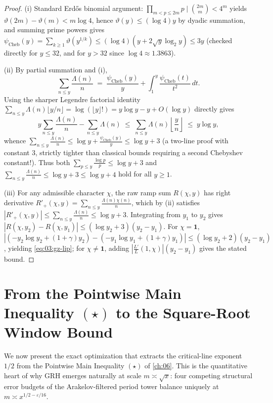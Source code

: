 \begin{proof}
(i) Standard Erd\H{o}s binomial argument: $\prod_{m < p \le 2m} p \mid \binom{2m}{m} < 4^m$ yields $\vartheta(2m) - \vartheta(m) < m\log 4$, hence $\vartheta(y) \le (\log 4) y$ by dyadic summation, and summing prime powers gives $\psi_{\mathrm{Cheb}}(y) = \sum_{k \ge 1} \vartheta(y^{1/k}) \le (\log 4)(y + 2\sqrt{y}\log_2 y) \le 3y$ (checked directly for $y \le 32$, and for $y > 32$ since $\log 4 \approx 1.3863$).

(ii) By partial summation and (i),
\[
  \sum_{n \le y} \frac{\Lambda(n)}{n} \;=\; \frac{\psi_{\mathrm{Cheb}}(y)}{y} + \int_1^y \frac{\psi_{\mathrm{Cheb}}(t)}{t^2}\,dt.
\]
Using the sharper Legendre factorial identity $\sum_{n \le y} \Lambda(n)\lfloor y/n \rfloor = \log(\lfloor y \rfloor!) = y\log y - y + O(\log y)$ directly gives
\[
  y \sum_{n \le y} \frac{\Lambda(n)}{n} - \sum_{n \le y} \Lambda(n) \;\le\; \sum_{n \le y} \Lambda(n)\left\lfloor \frac{y}{n} \right\rfloor \;\le\; y\log y,
\]
whence $\sum_{n \le y} \frac{\Lambda(n)}{n} \le \log y + \frac{\psi_{\mathrm{Cheb}}(y)}{y} \le \log y + 3$ (a two-line proof with constant $3$, strictly tighter than classical bounds requiring a second Chebyshev constant!). Thus both $\sum_{p \le y} \frac{\log p}{p} \le \log y + 3$ and $\sum_{n \le y}\frac{\Lambda(n)}{n} \le \log y + 3 \le \log y + 4$ hold for all $y \ge 1$.

(iii) For any admissible character $\chi$, the raw ramp sum $R(\chi, y)$ has right derivative $R'_+(\chi, y) = \sum_{n \le y} \frac{\Lambda(n)\chi(n)}{n}$, which by (ii) satisfies $|R'_+(\chi, y)| \le \sum_{n \le y} \frac{\Lambda(n)}{n} \le \log y + 3$. Integrating from $y_1$ to $y_2$ gives $|R(\chi, y_2) - R(\chi, y_1)| \le (\log y_2 + 3)(y_2 - y_1)$. For $\chi = \mathbf{1}$, $|(-y_2\log y_2 + (1+\gamma)y_2) - (-y_1\log y_1 + (1+\gamma)y_1)| \le (\log y_2 + 2)(y_2 - y_1)$, yielding \eqref{eq:03:gz-lip}; for $\chi \neq \mathbf{1}$, adding $|\frac{L'}{L}(1,\chi)|(y_2 - y_1)$ gives the stated bound.
\end{proof}

\section{From the Pointwise Main Inequality $(\star)$ to the Square-Root Window Bound}
\label{sec:03:star-to-window}

We now present the exact optimization that extracts the critical-line exponent $1/2$ from the Pointwise Main Inequality $(\star)$ of \cref{ch:06}. This is the quantitative heart of why GRH emerges naturally at scale $m \asymp \sqrt{x}$: four competing structural error budgets of the Arakelov-filtered period tower balance uniquely at $m \asymp x^{1/2-\varepsilon/16}$.

